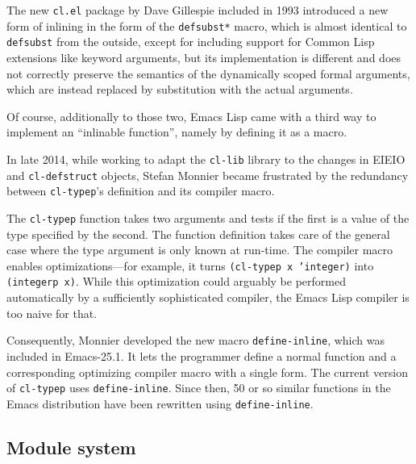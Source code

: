 \documentclass[format=acmsmall, review]{acmart}
\newcommand \Elisp {Emacs Lisp}
\begin{document}
The new \texttt{cl.el} package by Dave Gillespie included in 1993 introduced
a new form of inlining in the form of the \texttt{defsubst*} macro, which is
almost identical to \texttt{defsubst} from the outside, except for including
support for Common Lisp extensions like keyword arguments, but its
implementation is different and does not correctly preserve the semantics of
the dynamically scoped formal arguments, which are instead replaced by
substitution with the actual arguments.

Of course, additionally to those two, \Elisp{} came with a third way to
implement an ``inlinable function'', namely by defining it as a macro.

In late 2014, while working to adapt the \texttt{cl-lib} library to the
changes in EIEIO and \texttt{cl-defstruct} objects, Stefan Monnier became
frustrated by the redundancy between \texttt{cl-typep}'s definition and its
compiler macro.

The \texttt{cl-typep} function takes two arguments and tests if the first is
a value of the type specified by the second.  The function definition takes
care of the general case where the type argument is only known at run-time.
The compiler macro enables optimizations---for example, it turns
\texttt{(cl-typep x 'integer)} into \texttt{(integerp x)}.  While this
optimization could arguably be performed automatically by a sufficiently
sophisticated compiler, the \Elisp{} compiler is too naive for that.

Consequently, Monnier developed the new macro \texttt{define-inline},
which was included in Emacs-25.1.  It lets the programmer define a
normal function and a corresponding optimizing compiler macro with a
single form.  The current version of \texttt{cl-typep} uses
\texttt{define-inline}.  Since then, 50 or so similar functions in the
Emacs distribution have been rewritten using \texttt{define-inline}.


\subsection{Module system}
\label{sec:module-system}
\end{document}
